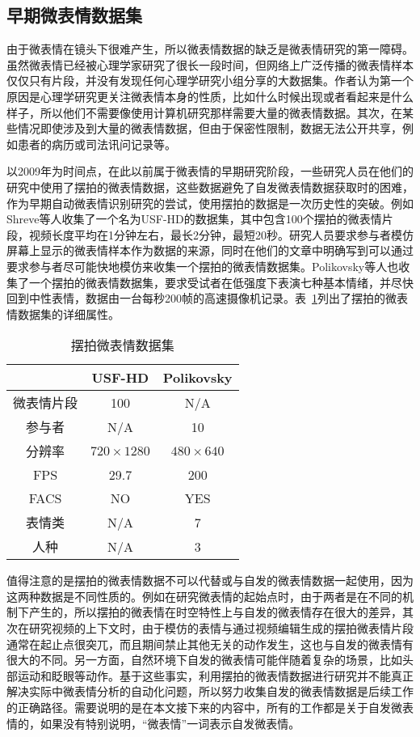 \subsection{早期微表情数据集}

由于微表情在镜头下很难产生，所以微表情数据的缺乏是微表情研究的第一障碍。虽然微表情已经被心理学家研究了很长一段时间，但网络上广泛传播的微表情样本仅仅只有片段，并没有发现任何心理学研究小组分享的大数据集。作者认为第一个原因是心理学研究更关注微表情本身的性质，比如什么时候出现或者看起来是什么样子，所以他们不需要像使用计算机研究那样需要大量的微表情数据。其次，在某些情况即使涉及到大量的微表情数据，但由于保密性限制，数据无法公开共享，例如患者的病历或司法讯问记录等。

以2009年为时间点，在此以前属于微表情的早期研究阶段，一些研究人员在他们的研究中使用了摆拍的微表情数据，这些数据避免了自发微表情数据获取时的困难，作为早期自动微表情识别研究的尝试，使用摆拍的数据是一次历史性的突破。例如Shreve等人收集了一个名为USF-HD的数据集，其中包含100个摆拍的微表情片段，视频长度平均在1分钟左右，最长2分钟，最短20秒。研究人员要求参与者模仿屏幕上显示的微表情样本作为数据的来源，同时在他们的文章中明确写到可以通过要求参与者尽可能快地模仿来收集一个摆拍的微表情数据集。Polikovsky等人也收集了一个摆拍的微表情数据集，要求受试者在低强度下表演七种基本情绪，并尽快回到中性表情，数据由一台每秒200帧的高速摄像机记录。表~\ref{tab3}列出了摆拍的微表情数据集的详细属性。

\begin{table}[!htbp]
\centering
\caption{摆拍微表情数据集}
\label{tab3}
\footnotesize%
\setlength{\tabcolsep}{5pt}%
\renewcommand{\arraystretch}{1.2}%
\begin{tabular}{c|cc}
\hline
 & USF-HD & Polikovsky \\ \hline
微表情片段 & 100 & N/A \\
参与者 & N/A & 10 \\
分辨率 & $720\times1280$ & $480\times640$ \\
FPS & 29.7 & 200 \\
FACS & NO & YES \\
表情类 & N/A & 7 \\
人种 & N/A & 3 \\ \hline
\end{tabular}
\end{table}

值得注意的是摆拍的微表情数据不可以代替或与自发的微表情数据一起使用，因为这两种数据是不同性质的。例如在研究微表情的起始点时，由于两者是在不同的机制下产生的，所以摆拍的微表情在时空特性上与自发的微表情存在很大的差异，其次在研究视频的上下文时，由于模仿的表情与通过视频编辑生成的摆拍微表情片段通常在起止点很突兀，而且期间禁止其他无关的动作发生，这也与自发的微表情有很大的不同。另一方面，自然环境下自发的微表情可能伴随着复杂的场景，比如头部运动和眨眼等动作。基于这些事实，利用摆拍的微表情数据进行研究并不能真正解决实际中微表情分析的自动化问题，所以努力收集自发的微表情数据是后续工作的正确路径。需要说明的是在本文接下来的内容中，所有的工作都是关于自发微表情的，如果没有特别说明，“微表情”一词表示自发微表情。


